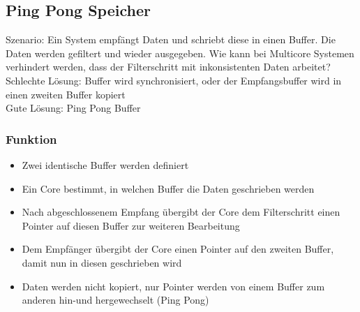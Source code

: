 \subsection{Ping Pong Speicher}
Szenario: Ein System empfängt Daten und schriebt diese in einen Buffer. Die Daten werden gefiltert und wieder ausgegeben. Wie kann bei Multicore Systemen verhindert werden, dass der Filterschritt mit inkonsistenten Daten arbeitet? \\
Schlechte Lösung: Buffer wird synchronisiert, oder der Empfangsbuffer wird in einen zweiten Buffer kopiert \\
Gute Lösung: Ping Pong Buffer

\subsubsection{Funktion}
\begin{itemize}
	\item Zwei identische Buffer werden definiert 
	\item Ein Core bestimmt, in welchen Buffer die Daten geschrieben werden 
	\item Nach abgeschlossenem Empfang übergibt der Core dem Filterschritt einen Pointer auf diesen Buffer zur weiteren Bearbeitung 
	\item Dem Empfänger übergibt der Core einen Pointer auf den zweiten Buffer, damit nun in diesen geschrieben wird
	\item Daten werden nicht kopiert, nur Pointer werden von einem Buffer zum anderen hin-und hergewechselt (Ping Pong)
\end{itemize}

